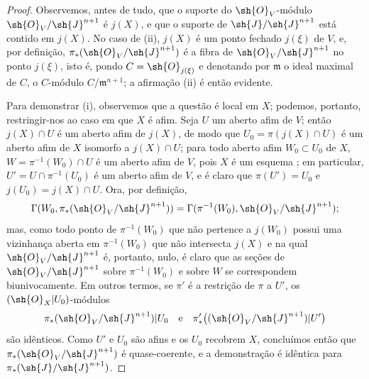\documentclass[oneside,10pt]{amsart}
\newcommand{\oldpage}[2][]{\marginnote{\normalfont\footnotesize\textbf{#1}~|~#2}\ignorespaces}
\begin{document}
\begin{proof}
Observemos, antes de tudo, que o suporte do $\sh{O}_V$-módulo $\sh{O}_V/\sh{J}^{n+1}$ é $j(X)$, e que o suporte de $\sh{J}/\sh{J}^{n+1}$ está contido em $j(X)$.
No caso de (ii), $j(X)$ é um ponto fechado $j(\xi)$ de $V$,
\oldpage[II]{185}
e, por definição, $\pi_*(\sh{O}_V/\sh{J}^{n+1})$ é a fibra de $\sh{O}_V/\sh{J}^{n+1}$ no ponto $j(\xi)$, isto é, pondo $C=\sh{O}_{j(\xi)}$ e denotando por $\mathfrak{m}$ o ideal maximal de $C$, o $C$-módulo $C/\mathfrak{m}^{n+1}$;
a afirmação (ii) é então evidente.

Para demonstrar (i), observemos que a questão é local em $X$;
podemos, portanto, restringir-nos ao caso em que $X$ é afim.
Seja $U$ um aberto afim de $V$;
então $j(X)\cap U$ é um aberto afim de $j(X)$, de modo que $U_0=\pi(j(X)\cap U)$ é um aberto afim de $X$ isomorfo a $j(X)\cap U$;
para todo aberto afim $W_0\subset U_0$ de $X$, $W=\pi^{-1}(W_0)\cap U$ é um aberto afim de $V$, pois $X$ é um esquema ;
em particular, $U'=U\cap\pi^{-1}(U_0)$ é um aberto afim de $V$, e é claro que $\pi(U')=U_0$ e $j(U_0)=j(X)\cap U$.
Ora, por definição,
\[
  \Gamma(W_0,\pi_*(\sh{O}_V/\sh{J}^{n+1}))
  =\Gamma(\pi^{-1}(W_0),\sh{O}_V/\sh{J}^{n+1});
\]
mas, como todo ponto de $\pi^{-1}(W_0)$ que não pertence a $j(W_0)$ possui uma vizinhança aberta em $\pi^{-1}(W_0)$ que não intersecta $j(X)$ e na qual $\sh{O}_V/\sh{J}^{n+1}$ é, portanto, nulo, é claro que as seções de $\sh{O}_V/\sh{J}^{n+1}$ sobre $\pi^{-1}(W_0)$ e sobre $W$ se correspondem biunivocamente.
Em outros termos, se $\pi'$ é a restrição de $\pi$ a $U'$, os $(\sh{O}_X|U_0)$-módulos
\[
  \pi_*(\sh{O}_V/\sh{J}^{n+1})|U_0
  \quad\hbox{e}\quad
  \pi'_*\bigl((\sh{O}_V/\sh{J}^{n+1})|U'\bigr)
\]
são idênticos.
Como $U'$ e $U_0$ são afins e os $U_0$ recobrem $X$, concluímos então  que $\pi_*(\sh{O}_V/\sh{J}^{n+1})$ é quase-coerente, e a demonstração é idêntica para $\pi_*(\sh{J}/\sh{J}^{n+1})$.


\end{proof}
\end{document}
